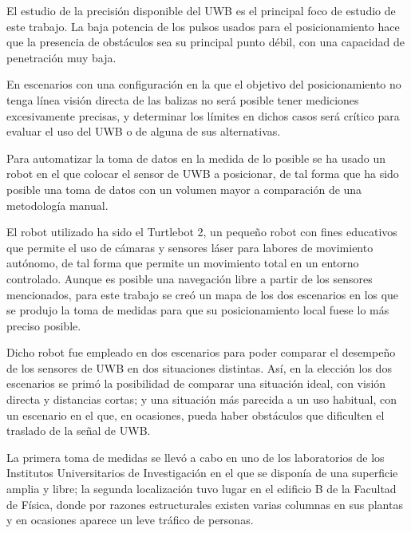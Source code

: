 El estudio de la precisión disponible del UWB es el principal foco de estudio de este trabajo.
La baja potencia de los pulsos usados para el posicionamiento hace que la presencia de obstáculos sea su principal punto débil, con una capacidad de penetración muy baja.

En escenarios con una configuración en la que el objetivo del posicionamiento no tenga línea visión directa de las balizas no será posible tener mediciones excesivamente precisas, y determinar los límites en dichos casos será crítico para evaluar el uso del UWB o de alguna de sus alternativas.

Para automatizar la toma de datos en la medida de lo posible se ha usado un robot en el que colocar el sensor de UWB a posicionar, de tal forma que ha sido posible una toma de datos con un volumen mayor a comparación de una metodología manual.

El robot utilizado ha sido el Turtlebot 2, un pequeño robot con fines educativos que permite el uso de cámaras y sensores láser para labores de movimiento autónomo, de tal forma que permite un movimiento total en un entorno controlado.
Aunque es posible una navegación libre a partir de los sensores mencionados, para este trabajo se creó un mapa de los dos escenarios en los que se produjo la toma de medidas para que su posicionamiento local fuese lo más preciso posible.

Dicho robot fue empleado en dos escenarios para poder comparar el desempeño de los sensores de UWB en dos situaciones distintas.
Así, en la elección los dos escenarios se primó la posibilidad de comparar una situación ideal, con visión directa y distancias cortas; y una situación más parecida a un uso habitual, con un escenario en el que, en ocasiones, pueda haber obstáculos que dificulten el traslado de la señal de UWB.

La primera toma de medidas se llevó a cabo en uno de los laboratorios de los Institutos Universitarios de Investigación en el que se disponía de una superficie amplia y libre; la segunda localización tuvo lugar en el edificio B de la Facultad de Física, donde por razones estructurales existen varias columnas en sus plantas y en ocasiones aparece un leve tráfico de personas.